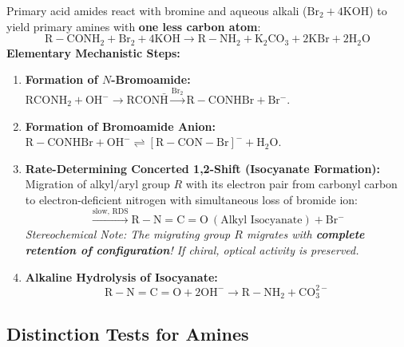 \documentclass[10pt,a4paper]{article}
\begin{document}
\begin{formulabox}
Primary acid amides react with bromine and aqueous alkali ($\mathrm{Br_2 + 4KOH}$) to yield primary amines with \textbf{one less carbon atom}:
\begin{equation}
  \mathrm{R-CONH_2} + \mathrm{Br_2} + 4\mathrm{KOH} \longrightarrow \mathbf{\mathrm{R-NH_2}} + \mathrm{K_2CO_3} + 2\mathrm{KBr} + 2\mathrm{H_2O}
\end{equation}
\textbf{Elementary Mechanistic Steps:}
\begin{enumerate}[leftmargin=*]
  \item \textbf{Formation of $N$-Bromoamide:} $\mathrm{RCONH_2} + \mathrm{OH^-} \to \mathrm{RCON\bar{H}} \xrightarrow{\mathrm{Br_2}} \mathrm{R-CONHBr} + \mathrm{Br^-}$.
  \item \textbf{Formation of Bromoamide Anion:} $\mathrm{R-CONHBr} + \mathrm{OH^-} \rightleftharpoons [\mathrm{R-CON-Br}]^- + \mathrm{H_2O}$.
  \item \textbf{Rate-Determining Concerted 1,2-Shift (Isocyanate Formation):}
  Migration of alkyl/aryl group $R$ with its electron pair from carbonyl carbon to electron-deficient nitrogen with simultaneous loss of bromide ion:
  \begin{equation}
    [\mathrm{R-CO-\bar{N}-Br}] \xrightarrow{\text{slow, RDS}} \mathbf{\mathrm{R-N=C=O}} \ (\text{Alkyl Isocyanate}) + \mathrm{Br^-}
  \end{equation}
  \textit{Stereochemical Note: The migrating group $R$ migrates with \textbf{complete retention of configuration}! If chiral, optical activity is preserved.}
  \item \textbf{Alkaline Hydrolysis of Isocyanate:}
  \begin{equation}
    \mathrm{R-N=C=O} + 2\mathrm{OH^-} \longrightarrow \mathbf{\mathrm{R-NH_2}} + \mathrm{CO_3^{2-}}
  \end{equation}
\end{enumerate}
\end{formulabox}

\subsection{Distinction Tests for Amines}
\end{document}
